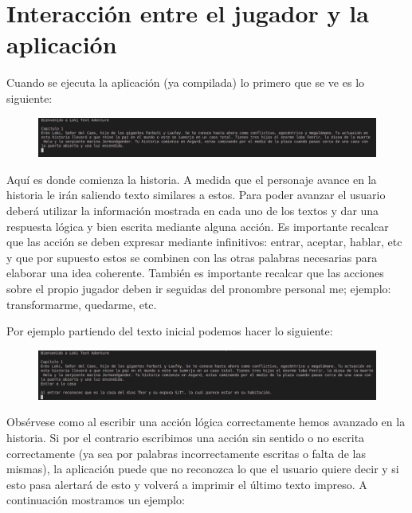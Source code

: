 \documentclass[12pt]{article}
\begin{document}
\section{Interacci\'on entre el jugador y la aplicaci\'on}

Cuando se ejecuta la aplicaci\'on (ya compilada) lo primero que se ve es lo siguiente:

\begin{figure}[h]
	\begin{center}
		\includegraphics[width =15.0cm]{./img/Inicial.png}
	\end{center}
\end{figure}

Aqu\'i es donde comienza la historia. A medida que el personaje avance en la historia le ir\'an saliendo texto similares a estos. Para poder avanzar el usuario deber\'a utilizar la informaci\'on mostrada en cada uno de los textos y dar una respuesta l\'ogica y bien escrita mediante alguna acci\'on. Es importante recalcar que las acci\'on se deben expresar mediante infinitivos: entrar, aceptar, hablar, etc y que por supuesto estos se combinen con las otras palabras necesarias para elaborar una idea coherente. Tambi\'en es importante recalcar que las acciones sobre el propio jugador deben ir seguidas del pronombre personal me; ejemplo: transformarme, quedarme, etc.

Por ejemplo partiendo del texto inicial podemos hacer lo siguiente:
\begin{figure}[h]
	\begin{center}
		\includegraphics[width =15.0cm]{./img/Avance.png}
	\end{center}
\end{figure}

Obs\'ervese como al escribir una acci\'on l\'ogica correctamente hemos avanzado en la historia. Si por el contrario escribimos una acci\'on sin sentido o no escrita correctamente (ya sea por palabras incorrectamente escritas o falta de las mismas), la aplicaci\'on puede que no reconozca lo que el usuario quiere decir y si esto pasa alertar\'a de esto y volver\'a a imprimir el \'ultimo texto impreso. A continuaci\'on mostramos un ejemplo:
\end{document}

